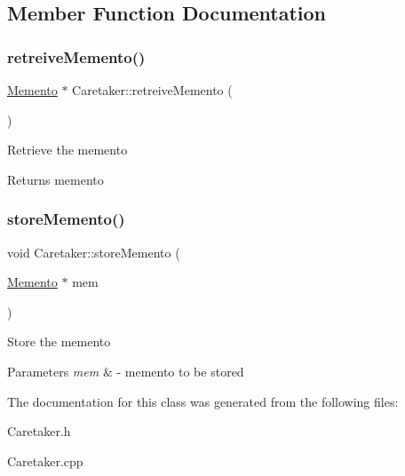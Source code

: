 \subsection{Member Function Documentation}
\mbox{\label{classCaretaker_a1d50fe3b0cbf191f1f260e0bb7f579e6}} 
\subsubsection{\texorpdfstring{retreive\+Memento()}{retreiveMemento()}}
{\footnotesize\ttfamily \hyperlink{classMemento}{Memento} $\ast$ Caretaker\+::retreive\+Memento (\begin{DoxyParamCaption}{ }\end{DoxyParamCaption})}

Retrieve the memento \begin{DoxyReturn}{Returns}
memento 
\end{DoxyReturn}
\mbox{\label{classCaretaker_af818c5b72a75066509b0f61989d67a93}} 
\subsubsection{\texorpdfstring{store\+Memento()}{storeMemento()}}
{\footnotesize\ttfamily void Caretaker\+::store\+Memento (\begin{DoxyParamCaption}\item[{\hyperlink{classMemento}{Memento} $\ast$}]{mem }\end{DoxyParamCaption})}

Store the memento 
\begin{DoxyParams}{Parameters}
{\em mem} & -\/ memento to be stored \\
\hline
\end{DoxyParams}


The documentation for this class was generated from the following files\+:\begin{DoxyCompactItemize}
\item 
Caretaker.\+h\item 
Caretaker.\+cpp\end{DoxyCompactItemize}

